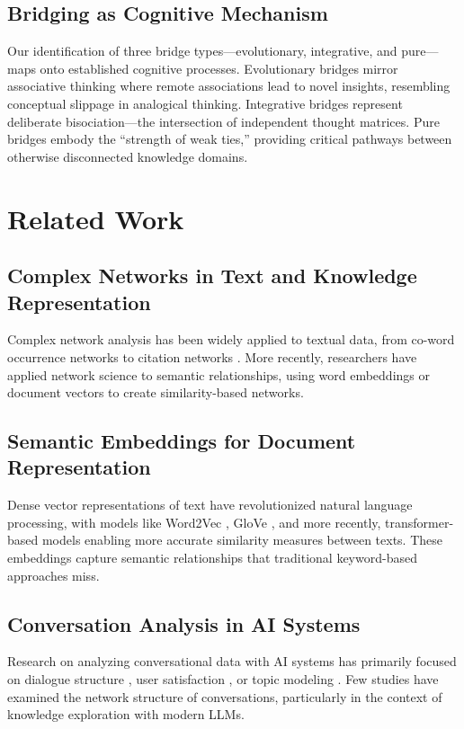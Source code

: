 \documentclass[10pt, a4paper]{article}
\begin{document}
\subsection{Bridging as Cognitive Mechanism}
Our identification of three bridge types—evolutionary, integrative, and pure—maps onto established cognitive processes. Evolutionary bridges mirror associative thinking where remote associations lead to novel insights, resembling conceptual slippage in analogical thinking. Integrative bridges represent deliberate bisociation—the intersection of independent thought matrices. Pure bridges embody the ``strength of weak ties,'' providing critical pathways between otherwise disconnected knowledge domains.

\section{Related Work}

\subsection{Complex Networks in Text and Knowledge Representation}

Complex network analysis has been widely applied to textual data, from co-word occurrence networks \cite{callon1983} to citation networks \cite{price1965}. More recently, researchers have applied network science to semantic relationships, using word embeddings \cite{levy2014} or document vectors \cite{mikolov2013} to create similarity-based networks.

\subsection{Semantic Embeddings for Document Representation}

Dense vector representations of text have revolutionized natural language processing, with models like Word2Vec \cite{mikolov2013}, GloVe \cite{pennington2014}, and more recently, transformer-based models \cite{devlin2019} enabling more accurate similarity measures between texts. These embeddings capture semantic relationships that traditional keyword-based approaches miss.

\subsection{Conversation Analysis in AI Systems}

Research on analyzing conversational data with AI systems has primarily focused on dialogue structure \cite{serban2016}, user satisfaction \cite{venkatesh2018}, or topic modeling \cite{zeng2019}. Few studies have examined the network structure of conversations, particularly in the context of knowledge exploration with modern LLMs.
\end{document}
